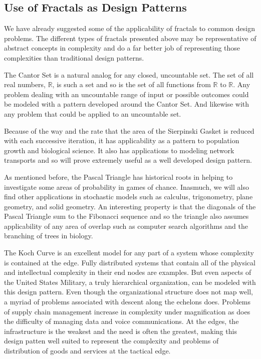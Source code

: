 \documentclass[jou,apacite]{apa6}
\begin{document}
\subsection{Use of Fractals as Design Patterns}
We have already suggested some of the applicability of fractals to common design problems.  The different types of fractals presented above may be representative of abstract concepts in complexity and do a far better job of representing those complexities than traditional design patterns.  

The Cantor Set is a natural analog for any closed, uncountable set.  The set of all real numbers, $\mathbb{R}$, is such a set and so is the set of all functions from $\mathbb{R}$ to $\mathbb{R}$.  Any problem dealing with an uncountable range of input or possible outcomes could be modeled with a pattern developed around the Cantor Set.  And likewise with any problem that could be applied to an uncountable set.

Because of the way and the rate that the area of the Sierpinski Gasket is reduced with each successive iteration, it has applicability as a pattern to population growth and biological science.  It also has applications to modeling network transports and so will prove extremely useful as a well developed design pattern.

As mentioned before, the Pascal Triangle has historical roots in helping to investigate some areas of probability in games of chance.  Inasmuch, we will also find other applications in stochastic models such as calculus, trigonometry, plane geometry, and solid geometry.  An interesting property is that the diagonals of the Pascal Triangle sum to the Fibonacci sequence and so the triangle also assumes applicability of any area of overlap such as computer search algorithms
and the branching of trees in biology.

The Koch Curve is an excellent model for any part of a system whose complexity is contained at the edge.  Fully distributed systems that contain all of the physical and intellectual complexity in their end nodes are examples.  But even aspects of the United States Military, a truly hierarchical organization, can be modeled with this design pattern.  Even though the organizational structure does not map well, a myriad of problems associated with descent along the echelons does.
Problems of supply chain management increase in complexity under magnification as does the difficulty of managing data and voice communications.  At the edges, the infrastructure is the weakest and the need is often the greatest, making this design patten well suited to represent the complexity and problems of distribution of goods and services at the tactical edge.
\end{document}
